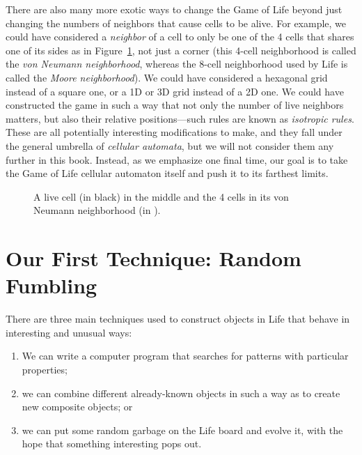 There are also many more exotic ways to change the Game of Life beyond just changing the numbers of neighbors that cause cells to be alive. For example, we could have considered a \emph{neighbor} of a cell to only be one of the 4 cells that shares one of its sides as in Figure~\ref{fig:vn_neighborhood}, not just a corner (this 4-cell neighborhood is called the \emph{von Neumann neighborhood}, whereas the 8-cell neighborhood used by Life is called the \emph{Moore neighborhood}). We could have considered a hexagonal grid instead of a square one, or a 1D or 3D grid instead of a 2D one. We could have constructed the game in such a way that not only the number of live neighbors matters, but also their relative positions---such rules are known as \emph{isotropic rules}. These are all potentially interesting modifications to make, and they fall under the general umbrella of \emph{cellular automata}, but we will not consider them any further in this book. Instead, as we emphasize one final time, our goal is to take the Game of Life cellular automaton itself and push it to its farthest limits.

\begin{figure}[!htb]
	\centering
	\caption{A live cell (in black) in the middle and the 4 cells in its von Neumann neighborhood (in ).}\label{fig:vn_neighborhood}
\end{figure}


\section{Our First Technique: Random Fumbling}\label{sec:fumbling}

There are three main techniques used to construct objects in Life that behave in interesting and unusual ways:\smallskip

\begin{enumerate}
	\item[1)] We can write a computer program that searches for patterns with particular properties;\smallskip
	
	\item[2)] we can combine different already-known objects in such a way as to create new composite objects; or\smallskip
	
	\item[3)] we can put some random garbage on the Life board and evolve it, with the hope that something interesting pops out.\smallskip
\end{enumerate}

